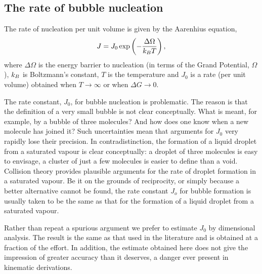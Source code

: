 \subsection{The rate of bubble nucleation}


The rate of nucleation per unit volume is given by the Aarenhius equation, 
\begin{align}
J = J_0\exp \lr{-\frac{\Delta \Omega}{\kB T}},%
\label{eqn:nuc:J}
\end{align}
where $\Delta \Omega$ is the energy barrier to nucleation (in terms of the Grand Potential, $\Omega$),
$k_B$ is Boltzmann's constant, $T$ is the temperature
and $J_0$ is a rate  (per unit volume) obtained when $T\rightarrow \infty$ or when $\Delta G \rightarrow 0$.

The rate constant, $J_0$, for bubble nucleation is problematic.
The reason is that the definition of a very small bubble is not clear conceptually.
What is meant, for example, by a bubble of three molecules?
And how does one know when a new molecule has joined it?
Such uncertainties mean that arguments for $J_0$ very rapidly lose their precision.
In contradistinction, the formation of a liquid droplet from a saturated vapour is clear conceptually:
a droplet of three molecules is easy to envisage, 
a cluster of just a few molecules is easier to define than a void.
Collision theory provides plausible arguments for the rate of droplet formation in a saturated vapour\cite{Katz1973}.
%
Be it on the grounds of reciprocity, or simply because a better alternative cannot be found,
the rate constant $J_o$ for bubble formation is usually taken to be the same 
as that for the formation of a liquid droplet from a saturated vapour\cite{Nyquist1995}.


Rather than repeat a spurious argument we prefer to estimate $J_0$ by dimensional analysis.
The result is the same as that used in the literature and is obtained at a fraction of the effort.
In addition, the estimate obtained here does not give the impression of greater accuracy than it deserves,
a danger ever present in kinematic derivations.

